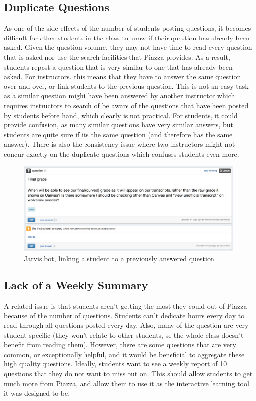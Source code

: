 \documentclass[sigconf]{acmart}
\begin{document}
\subsection{Duplicate Questions}
As one of the side effects of the number of students posting questions, it becomes difficult for other students in the class to know if their question has already been asked. Given the question volume, they may not have time to read every question that is asked nor use the search facilities that Piazza provides. As a result, students repost a question that is very similar to one that has already been asked. For instructors, this means that they have to answer the same question over and over, or link students to the previous question. This is not an easy task as a similar question might have been answered by another instructor which requires instructors to search of be aware of the questions that have been posted by students before hand, which clearly is not practical. For students, it could provide confusion, as many similar questions have very similar answers, but students are quite sure if its the same question (and therefore has the same answer). There is also the consistency issue where two instructors might not concur exactly on the duplicate questions which confuses students even more.

\begin{figure}
\includegraphics[width=\textwidth]{answer}
\caption{Jarvis bot, linking a student to a previously answered question}
\end{figure}

\subsection{Lack of a Weekly Summary}
A related issue is that students aren't getting the most they could out of Piazza because of the number of questions. Students can't dedicate hours every day to read through all questions posted every day. Also, many of the question are very student-specific (they won't relate to other students, so the whole class doesn't benefit from reading them). However, there are some questions that are very common, or exceptionally helpful, and it would be beneficial to aggregate these high quality questions. Ideally, students want to see a weekly report of 10 questions that they do not want to miss out on. This should allow students to get much more from Piazza, and allow them to use it as the interactive learning tool it was designed to be.
\end{document}

